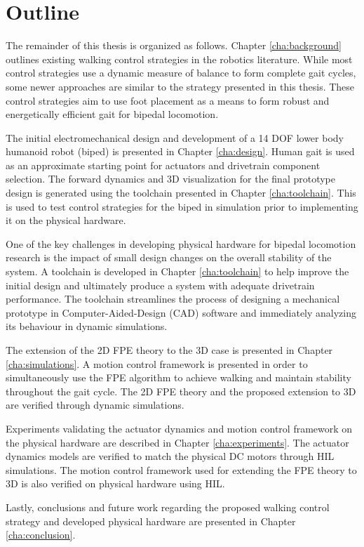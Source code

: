 
\section{Outline} %
\label{sec:outline}
The remainder of this thesis is organized as follows. Chapter \ref{cha:background} outlines existing walking control strategies in the robotics literature. While most control strategies use a dynamic measure of balance to form complete gait cycles, some newer approaches are similar to the strategy presented in this thesis. These control strategies aim to use foot placement as a means to form robust and energetically efficient gait for bipedal locomotion. 

The initial electromechanical design and development of a 14 DOF lower body humanoid robot (biped) is presented in Chapter \ref{cha:design}. Human gait is used as an approximate starting point for actuators and drivetrain component selection. The forward dynamics and 3D visualization for the final prototype design is generated using the toolchain presented in Chapter \ref{cha:toolchain}. This is used to test control strategies for the biped in simulation prior to implementing it on the physical hardware.

One of the key challenges in developing physical hardware for bipedal locomotion research is the impact of small design changes on the overall stability of the system. A toolchain is developed in Chapter \ref{cha:toolchain} to help improve the initial design and ultimately produce a system with adequate drivetrain performance. The toolchain streamlines the process of designing a mechanical prototype in Computer-Aided-Design (CAD) software and immediately analyzing its behaviour in dynamic simulations.

The extension of the 2D FPE theory to the 3D case is presented in Chapter \ref{cha:simulations}. A motion control framework is presented in order to simultaneously use the FPE algorithm to achieve walking and maintain stability throughout the gait cycle. The 2D FPE theory and the proposed extension to 3D are verified through dynamic simulations. 

Experiments validating the actuator dynamics and motion control framework on the physical hardware are described in Chapter \ref{cha:experiments}. The actuator dynamics models are verified to match the physical DC motors through HIL simulations. The motion control framework used for extending the FPE theory to 3D is also verified on physical hardware using HIL.  

Lastly, conclusions and future work regarding the proposed walking control strategy and developed physical hardware are presented in Chapter \ref{cha:conclusion}. 

